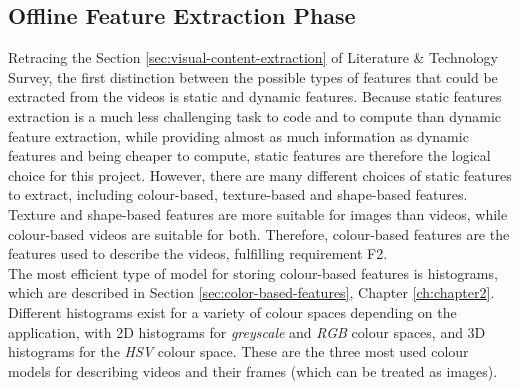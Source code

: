 \subsection{Offline Feature Extraction Phase}
\label{sec:design-offline-feature-extraction}

Retracing the Section \ref{sec:visual-content-extraction} of Literature \& Technology Survey, the first distinction between the possible types of features that could be extracted from the videos is static and dynamic features. Because static features extraction is a much less challenging task to code and to compute than dynamic feature extraction, while providing almost as much information as dynamic features and being cheaper to compute, static features are therefore the logical choice for this project. However, there are many different choices of static features to extract, including colour-based, texture-based and shape-based features. Texture and shape-based features are more suitable for images than videos, while colour-based videos are suitable for both. Therefore, colour-based features are the features used to describe the videos, fulfilling requirement F2.\\

The most efficient type of model for storing colour-based features is histograms, which are described in Section \ref{sec:color-based-features}, Chapter \ref{ch:chapter2}. Different histograms exist for a variety of colour spaces depending on the application, with 2D histograms for \textit{greyscale} and \textit{RGB} colour spaces, and 3D histograms for the \textit{HSV} colour space. These are the three most used colour models for describing videos and their frames (which can be treated as images).\\ 

